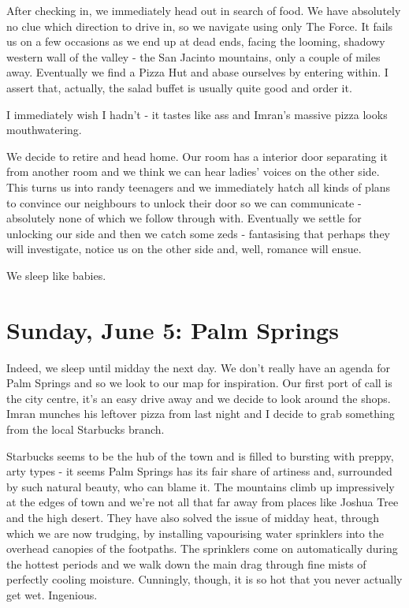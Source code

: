 \documentclass[a5paper,titlepage,11pt]{book}
\begin{document}
After checking in, we immediately head out in search of food.  We have absolutely no clue which direction to drive in, so we navigate using only The Force.  It fails us on a few occasions as we end up at dead ends, facing the looming, shadowy western wall of the valley - the San Jacinto mountains, only a couple of miles away.  Eventually we find a Pizza Hut and abase ourselves by entering within.  I assert that, actually, the salad buffet is usually quite good and order it.

I immediately wish I hadn't - it tastes like ass and Imran's massive pizza looks mouthwatering.

We decide to retire and head home.  Our room has a interior door separating it from another room and we think we can hear ladies' voices on the other side. This turns us into randy teenagers and we immediately hatch all kinds of plans to convince our neighbours to unlock their door so we can communicate - absolutely none of which we follow through with.  Eventually we settle for unlocking our side and then we catch some zeds - fantasising that perhaps they will investigate, notice us on the other side and, well, romance will ensue.

We sleep like babies.

\chapter[Palm Springs]{Sunday, June 5:  Palm Springs}
Indeed, we sleep until midday the next day.  We don't really have an agenda for Palm Springs and so we look to our map for inspiration.  Our first port of call is the city centre, it's an easy drive away and we decide to look around the shops.  Imran munches his leftover pizza from last night and I decide to grab something from the local Starbucks branch.

Starbucks seems to be the hub of the town and is filled to bursting with preppy, arty types - it seems Palm Springs has its fair share of artiness and, surrounded by such natural beauty, who can blame it.  The mountains climb up impressively at the edges of town and we're not all that far away from places like Joshua Tree and the high desert.  They have also solved the issue of midday heat, through which we are now trudging, by installing vapourising water sprinklers into the overhead canopies of the footpaths.  The sprinklers come on automatically during the hottest periods and we walk down the main drag through fine mists of perfectly cooling moisture.  Cunningly, though, it is so hot that you never actually get wet.  Ingenious.
\end{document}
